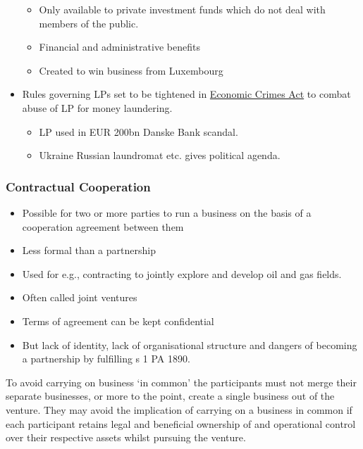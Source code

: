 \documentclass[
]{article}
\providecommand{\tightlist}{%
  \setlength{\itemsep}{0pt}\setlength{\parskip}{0pt}}
\begin{document}
\begin{itemize}
  \begin{itemize}
  \tightlist
  \item
    Only available to private investment funds which do not deal with
    members of the public.
  \item
    Financial and administrative benefits
  \item
    Created to win business from Luxembourg
  \end{itemize}
\item
  Rules governing LPs set to be tightened in
  \href{https://www.legislation.gov.uk/ukpga/2022/10/contents}{Economic
  Crimes Act} to combat abuse of LP for money laundering.

  \begin{itemize}
  \tightlist
  \item
    LP used in EUR 200bn Danske Bank scandal.
  \item
    Ukraine Russian laundromat etc. gives political agenda.
  \end{itemize}
\end{itemize}

\hypertarget{contractual-cooperation}{%
\subsubsection{Contractual Cooperation}\label{contractual-cooperation}}

\begin{itemize}
\tightlist
\item
  Possible for two or more parties to run a business on the basis of a
  cooperation agreement between them
\item
  Less formal than a partnership
\item
  Used for e.g., contracting to jointly explore and develop oil and gas
  fields.
\item
  Often called joint ventures
\item
  Terms of agreement can be kept confidential
\item
  But lack of identity, lack of organisational structure and dangers of
  becoming a partnership by fulfilling s 1 PA 1890.
\end{itemize}

To avoid carrying on business `in common' the participants must not
merge their separate businesses, or more to the point, create a single
business out of the venture. They may avoid the implication of carrying
on a business in common if each participant retains legal and beneficial
ownership of and operational control over their respective assets whilst
pursuing the venture.
\end{document}
